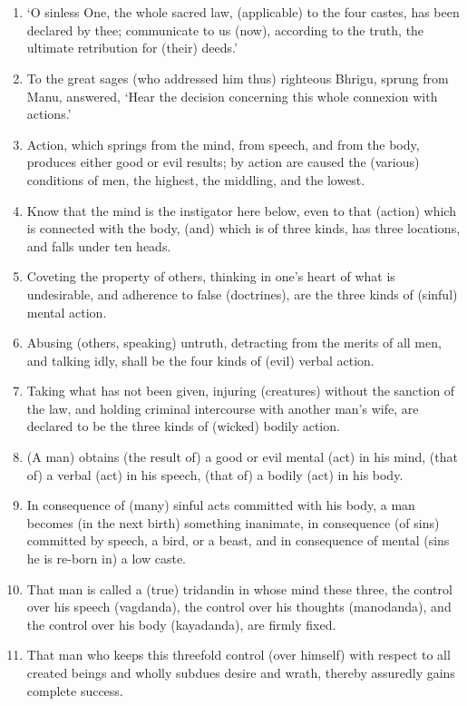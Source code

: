 \chapter{}
\begin{enumerate}
\item `O sinless One, the whole sacred law, (applicable) to the four castes, has been declared by thee; communicate to us (now), according to the truth, the ultimate retribution for (their) deeds.'
\item To the great sages (who addressed him thus) righteous Bhrigu, sprung from Manu, answered, `Hear the decision concerning this whole connexion with actions.'
\item Action, which springs from the mind, from speech, and from the body, produces either good or evil results; by action are caused the (various) conditions of men, the highest, the middling, and the lowest.
\item Know that the mind is the instigator here below, even to that (action) which is connected with the body, (and) which is of three kinds, has three locations, and falls under ten heads.
\item Coveting the property of others, thinking in one's heart of what is undesirable, and adherence to false (doctrines), are the three kinds of (sinful) mental action.
\item Abusing (others, speaking) untruth, detracting from the merits of all men, and talking idly, shall be the four kinds of (evil) verbal action.
\item Taking what has not been given, injuring (creatures) without the sanction of the law, and holding criminal intercourse with another man's wife, are declared to be the three kinds of (wicked) bodily action.
\item (A man) obtains (the result of) a good or evil mental (act) in his mind, (that of) a verbal (act) in his speech, (that of) a bodily (act) in his body.
\item In consequence of (many) sinful acts committed with his body, a man becomes (in the next birth) something inanimate, in consequence (of sins) committed by speech, a bird, or a beast, and in consequence of mental (sins he is re-born in) a low caste.
\item That man is called a (true) tridandin in whose mind these three, the control over his speech (vagdanda), the control over his thoughts (manodanda), and the control over his body (kayadanda), are firmly fixed.
\item That man who keeps this threefold control (over himself) with respect to all created beings and wholly subdues desire and wrath, thereby assuredly gains complete success.

\end{enumerate}
